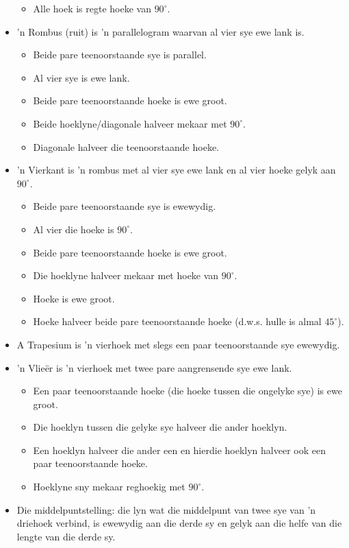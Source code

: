 \begin{itemize}[noitemsep]
\begin{itemize}
\item Alle hoek is regte hoeke van $90^{\circ}$.
\end{itemize}
\item ’n Rombus (ruit) is ’n parallelogram waarvan al vier sye ewe lank is.
\begin{itemize}
\item Beide pare teenoorstaande sye is parallel.
\item Al vier sye is ewe lank.
\item Beide pare teenoorstaande hoeke is ewe groot.
\item Beide hoeklyne/diagonale halveer mekaar met $90^\circ$.
\item Diagonale halveer die teenoorstaande hoeke.
\end{itemize}
\item ’n Vierkant is ’n rombus met al vier sye ewe lank en al vier hoeke gelyk aan $90^\circ$.
\begin{itemize}
\item Beide pare teenoorstaande sye is ewewydig.
\item Al vier die hoeke is $90^\circ$.
\item Beide pare teenoorstaande hoeke is ewe groot.
\item Die hoeklyne halveer mekaar met hoeke van $90^\circ$.
\item Hoeke is ewe groot.
\item Hoeke halveer beide pare teenoorstaande hoeke (d.w.s. hulle is almal $45^\circ$).
\end{itemize}
\item A Trapesium is 'n vierhoek met slegs een paar teenoorstaande sye ewewydig.
\item ’n Vlieër is ’n vierhoek met twee pare aangrensende sye ewe lank.
\begin{itemize}
\item Een paar teenoorstaande hoeke (die hoeke tussen die ongelyke sye) is ewe groot.
\item Die hoeklyn tussen die gelyke sye halveer die ander hoeklyn.
\item Een hoeklyn halveer die ander een en hierdie hoeklyn halveer ook een paar teenoorstaande hoeke.
\item Hoeklyne sny mekaar reghoekig met $90^\circ$.
\end{itemize}
\item Die middelpuntstelling: die lyn wat die middelpunt van twee sye van 'n driehoek verbind, is ewewydig aan die derde sy en gelyk aan die helfe van die lengte van die derde sy.
\end{itemize}

